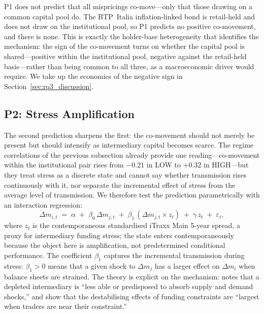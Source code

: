 P1 does not predict that all mispricings co-move---only that those
drawing on a common capital pool do. The BTP~Italia inflation-linked
bond is retail-held and does not draw on the institutional pool, so
P1 predicts no positive co-movement, and there is none. This is
exactly the holder-base heterogeneity that identifies the mechanism:
the sign of the co-movement turns on whether the capital pool is
shared---positive within the institutional pool, negative against the
retail-held basis---rather than being common to all three, as a
macroeconomic driver would require. We take up the economics of the
negative sign in Section~\ref{sec:rq3_discussion}.


\subsection{P2: Stress Amplification}
\label{sec:rq3_p2}

The second prediction sharpens the first: the co-movement should not
merely be present but should intensify as intermediary capital becomes
scarce. The regime correlations of the previous subsection already
provide one reading---co-movement within the institutional pair rises
from $-0.21$ in LOW to $+0.32$ in HIGH---but they treat stress as a
discrete state and cannot say whether transmission rises continuously
with it, nor separate the incremental effect of stress from the
average level of transmission. We therefore test the prediction
parametrically with an interaction regression:
\begin{equation}\label{eq:interaction}
  \Delta m_{i,t} \;=\; \alpha \;+\; \beta_0\, \Delta m_{j,t}
  \;+\; \beta_1\, (\Delta m_{j,t} \times z_t)
  \;+\; \gamma\, z_t \;+\; \varepsilon_t,
\end{equation}
where $z_t$ is the contemporaneous standardised iTraxx Main 5-year
spread, a proxy for intermediary funding stress; the state enters
contemporaneously because the object here is amplification, not
predetermined conditional performance. The coefficient $\beta_1$ captures the
incremental transmission during stress: $\beta_1 > 0$ means that a
given shock to $\Delta m_j$ has a larger effect on $\Delta m_i$ when
balance sheets are strained. The theory is explicit on the mechanism:
\citet{duffie2010presidential} notes that a depleted intermediary is
``less able or predisposed to absorb supply and demand shocks,'' and
\citet{brunnermeier2009market} show that the destabilising effects of
funding constraints are ``largest when traders are near their
constraint.''


